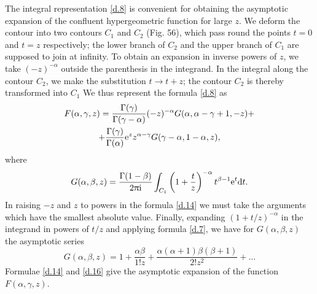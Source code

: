 The integral representation \eqref{d.8} is convenient for obtaining the asymptotic expansion of the confluent hypergeometric function for large $ z $. We deform the contour into two contours $ C_1 $ and $ C_2 $ (Fig. 56), which pass round the points $ t = 0 $ and $ t = z $ respectively; the lower branch of $ C_2 $ and the upper branch of $ C_1 $ are supposed to join at infinity. To obtain an expansion in inverse powers of $ z $, we take $ (-z)^{-\alpha} $ outside the parenthesis in the integrand. In the integral along the contour $ C_2 $, we make the substitution $ t \to t + z $; the contour $ C_2 $ is thereby transformed into $ C_1 $ We thus represent the formula \eqref{d.8} as
\begin{multline}\label{d.14}
F(\alpha,\gamma,z)=\frac{\Gamma(\gamma)}{\Gamma(\gamma-\alpha)}(-z)^{-\alpha}G(\alpha,\alpha-\gamma+1,-z)+\\
+\frac{\Gamma(\gamma)}{\Gamma(\alpha)}\mathrm{e}^z z^{\alpha-\gamma}G(\gamma-\alpha,1-\alpha,z),
\end{multline}
where
\begin{equation}\label{d.15}
G(\alpha,\beta,z)=\frac{\Gamma(1-\beta)}{2\uppi\mathrm{i}}\int_{C_1}\left(1+\frac{t}{z} \right)^{-\alpha}t^{\beta-1}\mathrm{e}^t\mathrm{d} t.
\end{equation}
In raising $ -z $ and $ z $ to powers in the formula \eqref{d.14} we must take the arguments which have the smallest absolute value. Finally, expanding $ (1 + t/z)^{-\alpha} $ in the integrand in powers of $ t/z $ and applying formula \eqref{d.7}, we have for $ G (\alpha, \beta, z) $ the asymptotic series
\begin{equation}\label{d.16}
G(\alpha,\beta,z)=1+\frac{\alpha\beta}{1!z}+\frac{\alpha(\alpha+1)\beta(\beta+1)}{2!z^2}+\dots
\end{equation}
Formulae \eqref{d.14} and \eqref{d.16} give the asymptotic expansion of the function $ F (\alpha, \gamma, z) $.

